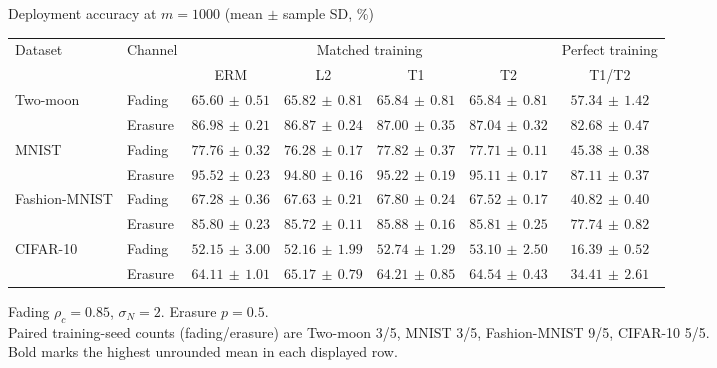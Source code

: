 \documentclass[border=4pt]{standalone}
\begin{document}
\begin{minipage}{7.8in}
\centering
Deployment accuracy at $m=1000$ (mean $\pm$ sample SD, \%)\\[4pt]
\begin{tabular*}{\linewidth}{@{\extracolsep{\fill}}llccccc@{}}
\toprule
\multirow{2}{*}{Dataset} & \multirow{2}{*}{Channel} & \multicolumn{4}{c}{Matched training} & Perfect training \\
\cmidrule(lr){3-6}\cmidrule(l){7-7}
 & & ERM & L2 & T1 & T2 & T1/T2 \\
\midrule
\multirow{2}{*}{Two-moon} & Fading & $65.60\,\pm\,0.51$ & $65.82\,\pm\,0.81$ & $\mathbf{65.84}\,\pm\,0.81$ & $65.84\,\pm\,0.81$ & $57.34\,\pm\,1.42$ \\
 & Erasure & $86.98\,\pm\,0.21$ & $86.87\,\pm\,0.24$ & $87.00\,\pm\,0.35$ & $\mathbf{87.04}\,\pm\,0.32$ & $82.68\,\pm\,0.47$ \\
\midrule[0.25pt]
\multirow{2}{*}{MNIST} & Fading & $77.76\,\pm\,0.32$ & $76.28\,\pm\,0.17$ & $\mathbf{77.82}\,\pm\,0.37$ & $77.71\,\pm\,0.11$ & $45.38\,\pm\,0.38$ \\
 & Erasure & $\mathbf{95.52}\,\pm\,0.23$ & $94.80\,\pm\,0.16$ & $95.22\,\pm\,0.19$ & $95.11\,\pm\,0.17$ & $87.11\,\pm\,0.37$ \\
\midrule[0.25pt]
\multirow{2}{*}{Fashion-MNIST} & Fading & $67.28\,\pm\,0.36$ & $67.63\,\pm\,0.21$ & $\mathbf{67.80}\,\pm\,0.24$ & $67.52\,\pm\,0.17$ & $40.82\,\pm\,0.40$ \\
 & Erasure & $85.80\,\pm\,0.23$ & $85.72\,\pm\,0.11$ & $\mathbf{85.88}\,\pm\,0.16$ & $85.81\,\pm\,0.25$ & $77.74\,\pm\,0.82$ \\
\midrule[0.25pt]
\multirow{2}{*}{CIFAR-10} & Fading & $52.15\,\pm\,3.00$ & $52.16\,\pm\,1.99$ & $52.74\,\pm\,1.29$ & $\mathbf{53.10}\,\pm\,2.50$ & $16.39\,\pm\,0.52$ \\
 & Erasure & $64.11\,\pm\,1.01$ & $\mathbf{65.17}\,\pm\,0.79$ & $64.21\,\pm\,0.85$ & $64.54\,\pm\,0.43$ & $34.41\,\pm\,2.61$ \\
\bottomrule
\end{tabular*}
\par\smallskip\raggedright\footnotesize
Fading $\rho_c=0.85$, $\sigma_N=2$. Erasure $p=0.5$.\\
Paired training-seed counts (fading/erasure) are Two-moon 3/5, MNIST 3/5, Fashion-MNIST 9/5, CIFAR-10 5/5.\\
Bold marks the highest unrounded mean in each displayed row.
\end{minipage}
\end{document}
